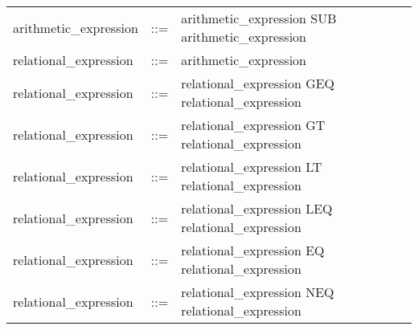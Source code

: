 \begin{longtable}{lrl}
arithmetic\_expression                     & ::= &
  \begin{minipage}[t]{\rulerhs}
    \raggedright
    arithmetic\_expression SUB arithmetic\_expression
  \end{minipage}                                                             \\
relational\_expression                     & ::= &
  \begin{minipage}[t]{\rulerhs}
    \raggedright
    arithmetic\_expression
  \end{minipage}                                                             \\
relational\_expression                     & ::= &
  \begin{minipage}[t]{\rulerhs}
    \raggedright
    relational\_expression GEQ relational\_expression
  \end{minipage}                                                             \\
relational\_expression                     & ::= &
  \begin{minipage}[t]{\rulerhs}
    \raggedright
    relational\_expression GT relational\_expression
  \end{minipage}                                                             \\
relational\_expression                     & ::= &
  \begin{minipage}[t]{\rulerhs}
    \raggedright
    relational\_expression LT relational\_expression
  \end{minipage}                                                             \\
relational\_expression                     & ::= &
  \begin{minipage}[t]{\rulerhs}
    \raggedright
    relational\_expression LEQ relational\_expression
  \end{minipage}                                                             \\
relational\_expression                     & ::= &
  \begin{minipage}[t]{\rulerhs}
    \raggedright
    relational\_expression EQ relational\_expression
  \end{minipage}                                                             \\
relational\_expression                     & ::= &
  \begin{minipage}[t]{\rulerhs}
    \raggedright
    relational\_expression NEQ relational\_expression

\end{minipage}
\end{longtable}
